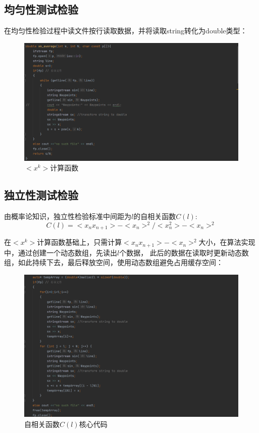 \documentclass{article}
\begin{document}
        \subsection{均匀性测试检验}
            在均匀性检验过程中读文件按行读取数据，并将读取string转化为double类型：
            \begin{figure}[H]
                \centering
                \includegraphics[width= .8\textwidth]{picture/11.png}
                \caption{$<x^k>$计算函数}
            \end{figure}

        \subsection{独立性测试检验}
            由概率论知识，独立性检验标准中间距为$l$的自相关函数$C(l)$:
                $${
                C(l)=<x_{n} x_{n+1}>-<x_n>^2/<x_n^2>-<x_n>^2
                }$$
            
            在$<x^k>$计算函数基础上，只需计算$<x_{n} x_{n+1}>-<x_n>^2$大小，在算法实现中，通过创建一个动态数组，先读出$l$个数据，
            此后的数据在读取时更新动态数组，如此持续下去，最后释放空间，使用动态数组避免占用缓存空间：
            \begin{figure}[H]
                \centering
                \includegraphics[width= .8\textwidth]{picture/222.png}
                \caption{自相关函数$C(l)$核心代码}
            \end{figure}
\end{document}
